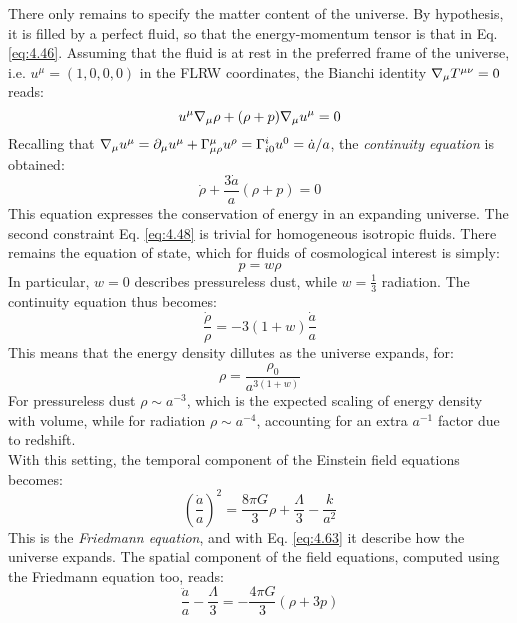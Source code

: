There only remains to specify the matter content of the universe. By hypothesis, it is filled by a perfect fluid, so that the energy-momentum tensor is that in Eq. \ref{eq:4.46}. Assuming that the fluid is at rest in the preferred frame of the universe, i.e. $ u^\mu = (1,0,0,0) $ in the FLRW coordinates, the Bianchi identity $ \nabla_\mu T^{\mu \nu} = 0 $ reads:
\begin{equation*}
  u^\mu \nabla_\mu \rho + (\rho + p) \nabla_\mu u^\mu = 0
\end{equation*}
Recalling that $ \nabla_\mu u^\mu = \partial_\mu u^\mu + \Gamma^\mu_{\mu \rho} u^\rho = \Gamma^i_{i0} u^0  = \dot{a} / a $, the \textit{continuity equation} is obtained:
\begin{equation}
  \dot{\rho} + \frac{3\dot{a}}{a} (\rho + p) = 0
  \label{eq:4.61}
\end{equation}
This equation expresses the conservation of energy in an expanding universe. The second constraint Eq. \ref{eq:4.48} is trivial for homogeneous isotropic fluids. There remains the equation of state, which for fluids of cosmological interest is simply:
\begin{equation}
  p = w \rho
  \label{eq:4.62}
\end{equation}
In particular, $ w = 0 $ describes pressureless dust, while $ w = \frac{1}{3} $ radiation. The continuity equation thus becomes:
\begin{equation*}
  \frac{\dot{\rho}}{\rho} = - 3 (1 + w) \frac{\dot{a}}{a}
\end{equation*}
This means that the energy density dillutes as the universe expands, for:
\begin{equation}
  \rho = \frac{\rho_0}{a^{3 (1 + w)}}
  \label{eq:4.63}
\end{equation}
For pressureless dust $ \rho \sim a^{-3} $, which is the expected scaling of energy density with volume, while for radiation $ \rho \sim a^{-4} $, accounting for an extra $ a^{-1} $ factor due to redshift.\\
With this setting, the temporal component of the Einstein field equations becomes:
\begin{equation}
  \left( \frac{\dot{a}}{a} \right)^2 = \frac{8\pi G}{3} \rho + \frac{\Lambda}{3} - \frac{k}{a^2}
  \label{eq:4.64}
\end{equation}
This is the \textit{Friedmann equation}, and with Eq. \ref{eq:4.63} it describe how the universe expands. The spatial component of the field equations, computed using the Friedmann equation too, reads:
\begin{equation}
  \frac{\ddot{a}}{a} - \frac{\Lambda}{3} = -\frac{4\pi G}{3} (\rho + 3p)
  \label{eq:4.65}
\end{equation}
